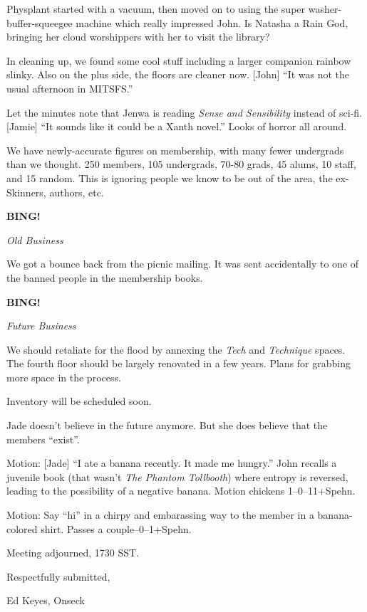 \documentclass[12pt]{article}
\newcommand{\bing}{{\bf BING!} }
\newcommand{\goto}[1]{\bing \vskip 12pt \centerline{{\em{#1}}}}
\begin{document}
Physplant started with a vacuum, then moved on to using the super
washer-buffer-squeegee machine which really impressed John.  Is Natasha
a Rain God, bringing her cloud worshippers with her to visit the library?

In cleaning up, we found some cool stuff including a larger companion
rainbow slinky.  Also on the plus side, the floors are cleaner now.
[John] ``It was not the usual afternoon in MITSFS.''

Let the minutes note that Jenwa is reading {\em Sense and Sensibility}
instead of sci-fi.  [Jamie] ``It sounds like it could be a Xanth novel.''
Looks of horror all around.

We have newly-accurate figures on membership, with many fewer undergrads
than we thought.  250 members, 105 undergrads, 70-80 grads, 45 alums,
10 staff, and 15 random.  This is ignoring people we know to be out of
the area, the ex-Skinners, authors, etc.

\goto{Old Business}

We got a bounce back from the picnic mailing.  It was sent accidentally
to one of the banned people in the membership books.

\goto{Future Business}

We should retaliate for the flood by annexing the {\em Tech} and
{\em Technique} spaces.  The fourth floor should be largely renovated
in a few years.  Plans for grabbing more space in the process.

Inventory will be scheduled soon.

Jade doesn't believe in the future anymore.  But she does believe that
the members ``exist''.

Motion: [Jade] ``I ate a banana recently.  It made me hungry.''  John
recalls a juvenile book (that wasn't {\em The Phantom Tollbooth}) where
entropy is reversed, leading to the possibility of a negative banana.
Motion chickens 1--0--11+Spehn.

Motion: Say ``hi'' in a chirpy and embarassing way to the member in a
banana-colored shirt.  Passes a couple--0--1+Spehn.

\vspace{12pt}

\noindent
Meeting adjourned, 1730 SST.

\vspace{18pt}

\centerline{Respectfully submitted,}
\centerline{Ed Keyes, Onseck}
\end{document}
